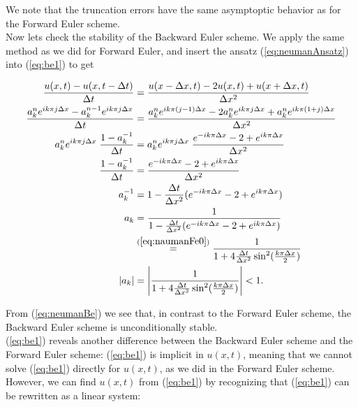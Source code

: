 \documentclass{article}
\begin{document}
We note that the truncation errors have the same asymptoptic behavior as for the Forward Euler scheme. \\

Now lets check the stability of the Backward Euler scheme. We apply the same method as we did for Forward Euler, and insert the ansatz (\ref{eq:neumanAnsatz}) into (\ref{eq:be1}) to get

\begin{subequations}
	\begin{align}
		\frac{u(x, t) - u(x,t - \Delta t)}{\Delta t}  &= \frac{u(x - \Delta x, t) - 2u(x,t) + u(x+ \Delta x, t)}{\Delta x^2} \\
		\frac{a_k^n e^{i k \pi j \Delta x} - a_k^{n-1} e^{i k \pi j \Delta x}}{\Delta t}  &= \frac{a_k^n e^{i k \pi (j -1)\Delta x} - 2a_k^n e^{i k \pi j \Delta x} + a_k^n e^{i k \pi (1 + j)\Delta x}}{\Delta x^2} \\
		a_k^n e^{i k \pi j \Delta x}\; \frac{1 - a_k^{-1}}{\Delta t}&=
		a_k^n e^{i k \pi j \Delta x}\; \frac{e^{-i k \pi \Delta x} - 2 + e^{i k \pi \Delta x}}{\Delta x^2}\\
		\frac{1 - a_k^{-1}}{\Delta t}&= \frac{e^{-i k \pi \Delta x} - 2 + e^{i k \pi \Delta x}}{\Delta x^2}\\
		a_k^{-1} &= 1 - \frac{\Delta t}{\Delta x^2} (e^{-i k \pi \Delta x} - 2 + e^{i k \pi \Delta x})\\
		a_k &= \frac{1}{1 - \frac{\Delta t}{\Delta x^2} (e^{-i k \pi \Delta x} - 2 + e^{i k \pi \Delta x})}\\
		&\stackrel{(\ref{eq:naumanFe0})}{=}  \frac{1}{1 + 4 \frac{\Delta t}{\Delta x^2} \sin^2(\frac{k\pi\Delta x}{2})}\\
		|a_k| &=  \left|\frac{1}{1 + 4 \frac{\Delta t}{\Delta x^2} \sin^2(\frac{k\pi\Delta x}{2})}\right| < 1.\label{eq:neumanBe}\\
	\end{align}
\end{subequations}

From (\ref{eq:neumanBe}) we see that, in contrast to the Forward Euler scheme, the Backward Euler scheme is unconditionally stable.\\


(\ref{eq:be1}) reveals another difference between the Backward Euler scheme and the Forward Euler scheme: (\ref{eq:be1}) is implicit in $u(x,t)$, meaning that we cannot solve (\ref{eq:be1}) directly for $u(x,t)$, as we did in the Forward Euler scheme. However, we can find $u(x,t)$ from (\ref{eq:be1}) by recognizing that (\ref{eq:be1}) can be rewritten as a linear system:
\end{document}
